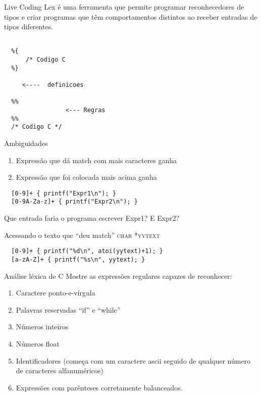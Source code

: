 \documentclass{beamer}
\begin{document}
\begin{frame}[fragile]{Live Coding}
  \centering
  \large
  Lex é uma ferramenta que permite programar reconhecedores de tipos e criar
  programas que têm comportamentos distintos ao receber entradas de tipos
  diferentes.
  \begin{verbatim}

  %{
      /* Codigo C
  %}

     <----  definicoes

  %%
                 <--- Regras
  %%
  /* Codigo C */

  \end{verbatim}

\end{frame}


\begin{frame}[fragile]{Ambiguidades}
  \centering
  \large
  \begin{enumerate}
    \item Expressão que dá match com mais caracteres ganha
    \item Expressão que foi colocada mais acima ganha
  \end{enumerate}

  \begin{verbatim}
  [0-9]+ { printf("Expr1\n"); }
  [0-9A-Za-z]+ { printf("Expr2\n"); }
  \end{verbatim}

  Que entrada faria o programa escrever Expr1? E Expr2?
\end{frame}

\begin{frame}[fragile]{Acessando o texto que ``deu match''}
  \centering
  \large
  \textsc{char *yytext}

  \begin{verbatim}
  [0-9]+ { printf("%d\n", atoi(yytext)+1); }
  [a-zA-Z]+ { printf("%s\n", yytext); }
  \end{verbatim}
\end{frame}


\begin{frame}{Análise léxica de C}
\large
Mostre as expressões regulares capazes de reconhecer:
  \begin{enumerate}
    \item Caractere ponto-e-vírgula
    \item Palavras reservadas ``if'' e ``while''
    \item Números inteiros
    \item Números float
    \item Identificadores (começa com um caractere ascii seguido de qualquer
      número de caracteres alfanuméricos)
    \item Expressões com parênteses corretamente balanceados.
  \end{enumerate}
\end{frame}
\end{document}
